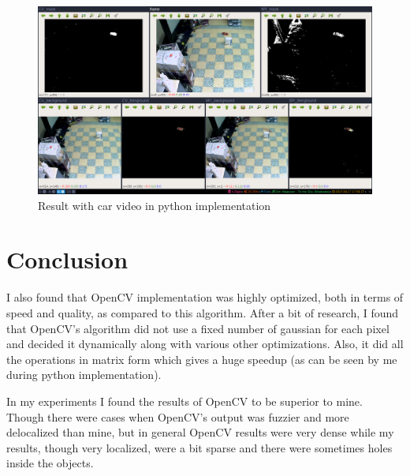 \documentclass[12pt]{article}
\begin{document}
\begin{figure}
    \includegraphics[width=\linewidth]{images/python/2017-09-17_17-58-28-1366x768.png}
    \caption{Result with car video in python implementation}
    \label{fig:boat1}
\end{figure}

\section{Conclusion}
I also found that OpenCV implementation was highly optimized, both in terms of speed and quality,
as compared to this algorithm. After a bit of research, I found that OpenCV's algorithm did not use a fixed number of gaussian for each
pixel and decided it dynamically along with various other optimizations. Also, it did all the operations in matrix form which gives a
huge speedup (as can be seen by me during python implementation).

In my experiments I found the results of OpenCV to be superior to mine. Though there were cases when OpenCV's output was fuzzier and
more delocalized than mine, but in general OpenCV results were very dense while my results, though very localized, were a bit sparse
and there were sometimes holes inside the objects.
\end{document}

